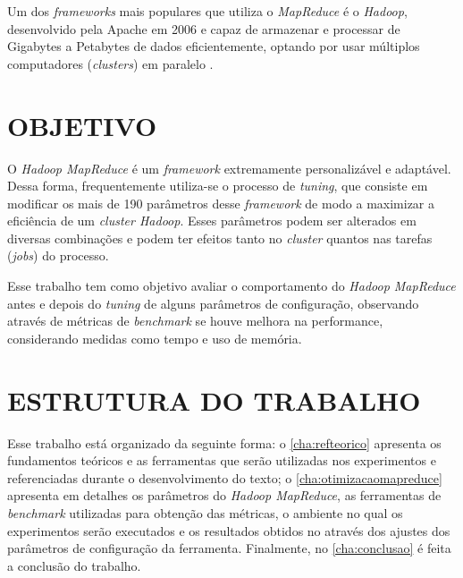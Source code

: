 Um dos \textit{\gls{framework}s} mais populares que utiliza o \textit{MapReduce} é o \textit{Hadoop}, desenvolvido pela Apache em 2006 e capaz de armazenar e processar de Gigabytes a Petabytes de dados eficientemente, optando por usar múltiplos computadores (\textit{clusters}) em paralelo \cite{HadoopBook15}.

\section{OBJETIVO} \label{sec:objetivo}

O \textit{Hadoop MapReduce} é um \textit{\gls{framework}} extremamente personalizável e adaptável. Dessa forma, frequentemente utiliza-se o processo de \textit{\gls{tuning}}, que consiste em modificar os mais de 190 parâmetros desse \textit{\gls{framework}} de modo a maximizar a eficiência de um \textit{cluster Hadoop}. Esses parâmetros podem ser alterados em diversas combinações e podem ter efeitos tanto no \textit{cluster} quantos nas tarefas (\textit{jobs}) do processo.

Esse trabalho tem como objetivo avaliar o comportamento do \textit{Hadoop MapReduce} antes e depois do \textit{\gls{tuning}} de alguns parâmetros de configuração, observando através de métricas de \textit{\gls{benchmark}} se houve melhora na performance, considerando medidas como tempo e uso de memória.

\section{ESTRUTURA DO TRABALHO} \label{sec:estrtura}

Esse trabalho está organizado da seguinte forma: o \autoref{cha:refteorico} apresenta os fundamentos teóricos e as ferramentas que serão utilizadas nos experimentos e referenciadas durante o desenvolvimento do texto; o \autoref{cha:otimizacaomapreduce} apresenta em detalhes os parâmetros do \textit{Hadoop MapReduce}, as ferramentas de \textit{\gls{benchmark}} utilizadas para obtenção das métricas, o ambiente no qual os experimentos serão executados e os resultados obtidos no através dos ajustes dos parâmetros de configuração da ferramenta. Finalmente, no \autoref{cha:conclusao} é feita a conclusão do trabalho.